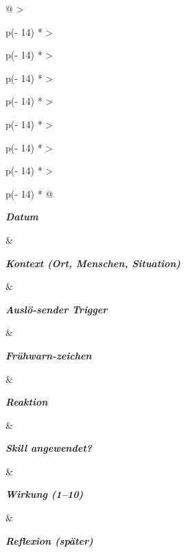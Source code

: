 \begin{longtable}[]{@{}
  >{\raggedright\arraybackslash}p{(\columnwidth - 14\tabcolsep) * }
  >{\raggedright\arraybackslash}p{(\columnwidth - 14\tabcolsep) * }
  >{\raggedright\arraybackslash}p{(\columnwidth - 14\tabcolsep) * }
  >{\raggedright\arraybackslash}p{(\columnwidth - 14\tabcolsep) * }
  >{\raggedright\arraybackslash}p{(\columnwidth - 14\tabcolsep) * }
  >{\raggedright\arraybackslash}p{(\columnwidth - 14\tabcolsep) * }
  >{\raggedright\arraybackslash}p{(\columnwidth - 14\tabcolsep) * }
  >{\raggedright\arraybackslash}p{(\columnwidth - 14\tabcolsep) * }@{}}
\toprule\noalign{}
\begin{minipage}[b]{\linewidth}\raggedright
\emph{\textbf{Datum}}
\end{minipage} \& \begin{minipage}[b]{\linewidth}\raggedright
\emph{\textbf{Kontext (Ort, Menschen, Situation)}}
\end{minipage} \& \begin{minipage}[b]{\linewidth}\raggedright
\emph{\textbf{Auslö-sender Trigger}}
\end{minipage} \& \begin{minipage}[b]{\linewidth}\raggedright
\emph{\textbf{Frühwarn-zeichen}}
\end{minipage} \& \begin{minipage}[b]{\linewidth}\raggedright
\emph{\textbf{Reaktion}}
\end{minipage} \& \begin{minipage}[b]{\linewidth}\raggedright
\emph{\textbf{Skill angewendet?}}
\end{minipage} \& \begin{minipage}[b]{\linewidth}\raggedright
\emph{\textbf{Wirkung (1--10)}}
\end{minipage} \& \begin{minipage}[b]{\linewidth}\raggedright
\emph{\textbf{Reflexion (später)}}
\end{minipage} \\
\midrule\noalign{}
\endhead
\bottomrule\noalign{}
\endlastfoot
📝


\end{longtable}
